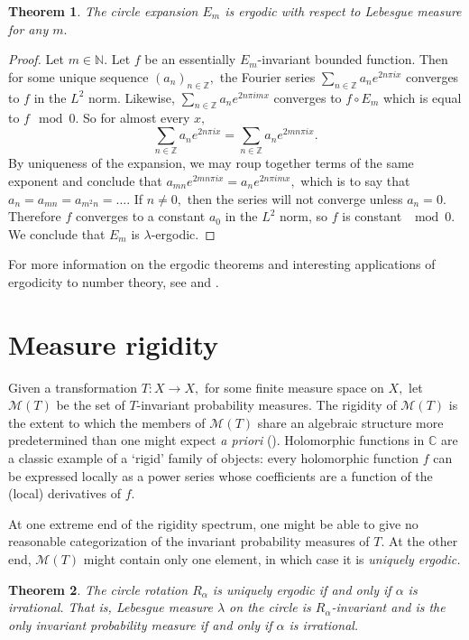 \documentclass[12pt, letterpaper, oneside]{book}
\newcommand{\ga}{\ensuremath{\alpha}}
\newcommand{\gl}{\ensuremath{\lambda}}
\newcommand{\C}{\mathbb{C}}
\newcommand{\N}{\mathbb{N}}
\newcommand{\Z}{\mathbb{Z}}
\theoremstyle{plain}
\newtheorem{theorem}{Theorem}
\theoremstyle{definition}
\theoremstyle{remark}
\begin{document}
 \begin{theorem}
 The circle expansion $E_m$ is ergodic with respect to Lebesgue measure for any $m.$
 \end{theorem}
 \begin{proof}
 Let $m \in \N.$ Let $f$ be an essentially $E_m$-invariant bounded function. Then for some unique sequence $(a_n)_{n \in \Z},$ the Fourier series  $\sum_{n \in \Z} a_ne^{2n\pi ix}$ converges to $f$ in the $L^2$ norm. Likewise, $\sum_{n \in \Z} a_ne^{2n\pi imx}$ converges to $f \circ E_m$ which is equal to $f \mod 0.$ So for almost every $x,$
 \[
 \sum_{n \in \Z} a_ne^{2n\pi ix} = \sum_{n \in \Z} a_ne^{2mn\pi ix}.
 \]
By uniqueness of the expansion, we may roup together terms of the same exponent and conclude that $a_{mn}e^{2mn\pi ix} = a_{n}e^{2n\pi imx},$ which is to say that $a_n = a_{mn} = a_{m^2n} = \ldots.$ If $n \neq 0,$ then the series will not converge unless $a_n = 0.$ Therefore $f$ converges to a constant $a_0$ in the $L^2$ norm, so $f$ is constant $\mod 0.$ We conclude that $E_m$ is $\lambda$-ergodic. 
 \end{proof}
 
 For more information on the ergodic theorems and interesting applications of ergodicity to number theory, see \cite{MB02} and \cite{ME11}.

\section{Measure rigidity}

Given a transformation $T:X \to X,$ for some finite measure space on $X,$ let $\mathcal{M}(T)$ be the set of $T$-invariant probability measures. The rigidity of $\mathcal{M}(T)$ is the extent to which the members of $\mathcal{M}(T)$ share an algebraic structure more predetermined than one might expect \textit{a priori} (\cite{Ein09}). Holomorphic functions in $\C$ are a classic example of a `rigid' family of objects: every holomorphic function $f$ can be expressed locally as a power series whose coefficients are a function of the (local) derivatives of $f.$

At one extreme end of the rigidity spectrum, one might be able to give no reasonable categorization of the invariant probability measures of $T.$ At the other end, $\mathcal{M}(T)$ might contain only one element, in which case it is \textit{uniquely ergodic.}


\begin{theorem}
The circle rotation $R_\ga$ is uniquely ergodic if and only if $\ga$ is irrational. That is, Lebesgue measure $\gl$ on the circle is $R_\ga$-invariant and is the only invariant probability measure if and only if $\ga$ is irrational. 
\end{theorem}
\end{document}
